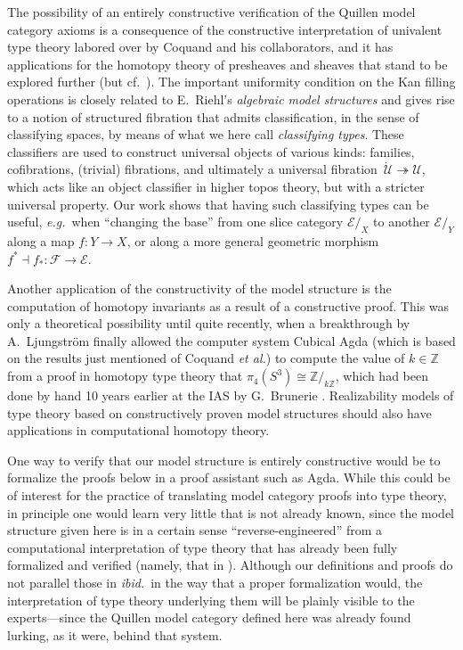 \documentclass[11pt,reqno]{amsart}
\newcommand{\eg}{\emph{e.g.}}
\newcommand{\ibid}{\emph{ibid.}}
\newcommand{\Z}{\ensuremath{\mathbb{Z}}}
\newcommand{\FF}{\ensuremath{\mathcal{F}}}
\newcommand{\EE}{\ensuremath{\mathcal{E}}}
\newcommand{\fib}{\ensuremath{\twoheadrightarrow}}
\renewcommand{\to}{\ensuremath{\rightarrow}}
\newcommand{\U}{\ensuremath{\mathcal{U}}}
\newcommand{\UU}{\ensuremath{\,\dot{\mathcal{U}}}}
\theoremstyle{remark}
\theoremstyle{definition}
\begin{document}
The possibility of an entirely constructive verification of the Quillen model category axioms is a consequence of the constructive interpretation of univalent type theory labored over by Coquand and his collaborators, and it has applications for the homotopy theory of presheaves and sheaves that stand to be explored further (but cf.~\cite{Coq:stack2017}).   The important uniformity condition on the Kan filling operations is closely related to E.~Riehl's \emph{algebraic model structures} \cite{riehl-algebraic-model} and gives rise to a notion of structured fibration that admits classification, in the sense of classifying spaces, by means of what we here call \emph{classifying types}.   These classifiers are used to construct universal objects of various kinds: families, cofibrations, (trivial) fibrations, and ultimately a universal fibration $\UU\fib\U$, which acts like an object classifier in higher topos theory, but with a stricter universal property.  Our work shows that having such classifying types can be useful, \eg\ when ``changing the base'' from one slice category $\EE/_X$ to another $\EE/_Y$ along a map $f : Y\to X$, or along a more general geometric morphism $f^*\dashv f_* : \FF \to \EE$.

Another application of the constructivity of the model structure is the computation of homotopy invariants as a result of a constructive proof.  This was only a theoretical possibility until quite recently, when a breakthrough by  A.~Ljungstr\"om \cite{AxelLj:2022} finally allowed the computer system Cubical Agda \cite{VezzosiMortbergAbel19} (which is based on the results just mentioned of Coquand \emph{et al.}) to compute the value of $k\in \Z$ from a proof in homotopy type theory that $\pi_4(S^3)\cong \Z/_{\!k\Z}$, which had been done by hand 10 years earlier at the IAS by G.\ Brunerie \cite{GB:IAS2013}.  Realizability models of type theory based on constructively proven model structures should also have applications in computational homotopy theory.

One way to verify that our model structure is entirely constructive would be to formalize the proofs below in a proof assistant such as Agda.  While this could be of interest for the practice of translating model category proofs into type theory, in principle one would learn very little that is not already known, since the model structure given here is in a certain sense ``reverse-engineered'' from a computational interpretation of type theory that has already been fully formalized and verified (namely, that in \cite{ABCHFL}).  Although our definitions and proofs do not parallel those in \ibid\ in the way that a proper formalization would, the interpretation of type theory underlying them will be plainly visible to the experts---since the Quillen model category defined here was already found lurking, as it were, behind that system.
\end{document}
